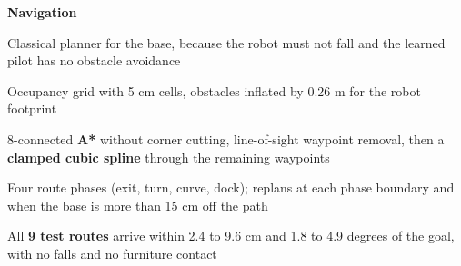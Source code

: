 \documentclass[letterpaper,11pt]{article}
\newcommand{\subhead}[1]{\par\vspace{4pt}\textbf{#1}\par\nobreak\vspace{-1pt}}
\begin{document}
{\subhead{Navigation}
\begin{points}
  \item Classical planner for the base, because the robot must not fall and the learned pilot has no obstacle avoidance
  \item Occupancy grid with 5 cm cells, obstacles inflated by 0.26 m for the robot footprint
  \item 8-connected \textbf{A*} without corner cutting, line-of-sight waypoint removal, then a \textbf{clamped cubic spline} through the remaining waypoints
  \item Four route phases (exit, turn, curve, dock); replans at each phase boundary and when the base is more than 15 cm off the path
  \item All \textbf{9 test routes} arrive within 2.4 to 9.6 cm and 1.8 to 4.9 degrees of the goal, with no falls and no furniture contact
\end{points}
}
\end{document}

